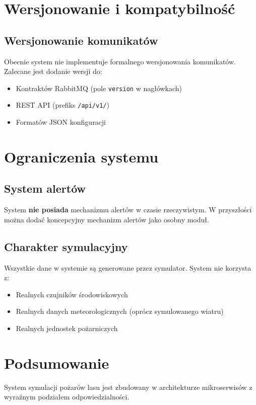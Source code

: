 \documentclass[11pt,a4paper]{article}
\begin{document}
\section{Wersjonowanie i kompatybilność}

\subsection{Wersjonowanie komunikatów}

Obecnie system nie implementuje formalnego wersjonowania komunikatów. Zalecane jest dodanie wersji do:
\begin{itemize}
    \item Kontraktów RabbitMQ (pole \texttt{version} w nagłówkach)
    \item REST API (prefiks \texttt{/api/v1/})
    \item Formatów JSON konfiguracji
\end{itemize}

\section{Ograniczenia systemu}

\subsection{System alertów}

System \textbf{nie posiada} mechanizmu alertów w czasie rzeczywistym. W przyszłości można dodać koncepcyjny mechanizm alertów jako osobny moduł.

\subsection{Charakter symulacyjny}

Wszystkie dane w systemie są generowane przez symulator. System nie korzysta z:
\begin{itemize}
    \item Realnych czujników środowiskowych
    \item Realnych danych meteorologicznych (oprócz symulowanego wiatru)
    \item Realnych jednostek pożarniczych
\end{itemize}

\section{Podsumowanie}

System symulacji pożarów lasu jest zbudowany w architekturze mikroserwisów z wyraźnym podziałem odpowiedzialności. 
\end{document}
